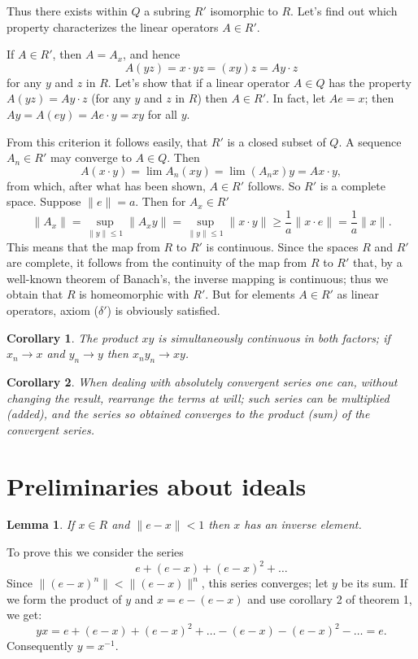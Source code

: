 \documentclass{article}
\newtheorem{corollary}{Corollary}
\newtheorem{lemma}{Lemma}
\theoremstyle{definition}
\begin{document}
Thus there exists within $Q$ a subring $R'$ isomorphic to $R$. Let's find out which property characterizes the linear operators $A\in R'$.

If $A\in R'$, then $A=A_x$, and hence
$$ A(yz) = x\cdot yz = (xy)z = Ay\cdot z $$
for any $y$ and $z$ in $R$. Let's show that if a linear operator $A\in Q$ has the property $A(yz)=Ay\cdot z$ (for any $y$ and $z$ in $R$) then $A\in R'$. In fact, let $Ae=x$; then $Ay=A(ey)=Ae\cdot y=xy$ for all $y$.

From this criterion it follows easily, that $R'$ is a closed subset of $Q$. A sequence $A_n\in R'$ may converge to $A\in Q$. Then $$A(x\cdot y)=\lim A_n(xy)=\lim (A_nx)y=Ax\cdot y,$$ from which, after what has been shown, $A\in R'$ follows. So $R'$ is a complete space. Suppose $\|e\|=a$. Then for $A_x\in R'$
$$ \|A_x\| = \sup_{\|y\|\leq1}\|A_xy\| = \sup_{\|y\|\leq1}\|x\cdot y\| \geq \frac1a \|x\cdot e\| = \frac1a\|x\|. $$
This means that the map from $R$ to $R'$ is continuous. Since the spaces $R$ and $R'$ are complete, it follows from the continuity of the map from $R$ to $R'$ that, by a well-known theorem of Banach's, the inverse mapping is continuous; thus we obtain that $R$ is homeomorphic with $R'$. But for elements $A\in R'$ as linear operators, axiom ($\delta'$) is obviously satisfied.
\begin{corollary}
  The product $xy$ is simultaneously continuous in both factors; if $x_n \to x$ and $y_n \to y$ then $x_ny_n \to xy$.
\end{corollary}
\begin{corollary}
  When dealing with absolutely convergent series one can, without changing the result, rearrange the terms at will; such series can be multiplied (added), and the series so obtained converges to the product (sum) of the convergent series.
\end{corollary}

\section{Preliminaries about ideals}
\begin{lemma}
  If $x\in R$ and $\|e - x\| < 1$ then $x$ has an inverse element.
\end{lemma}
To prove this we consider the series
$$ e + (e-x) + (e-x)^2 + \dots $$
Since $\|(e - x)^n\| < \|(e - x)\|^n$, this series converges; let $y$ be its sum. If we form the product of $y$ and $x=e-(e-x)$ and use corollary 2 of theorem 1, we get:
$$ yx = e + (e-x) + (e-x)^2 + \dots - (e-x) - (e-x)^2 - \dots = e. $$
Consequently $y = x^{-1}$.
\end{document}
